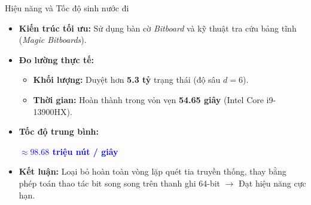 \begin{frame}{Hiệu năng và Tốc độ sinh nước đi}
    \begin{itemize}
        \item<1-> \textbf{Kiến trúc tối ưu:} Sử dụng bàn cờ \textit{Bitboard} và kỹ thuật tra cứu bảng tĩnh (\textit{Magic Bitboards}).
        \item<2-> \textbf{Đo lường thực tế:}
        \begin{itemize}
            \item \textbf{Khối lượng:} Duyệt hơn \textbf{5.3 tỷ} trạng thái (độ sâu $d=6$).
            \item \textbf{Thời gian:} Hoàn thành trong vỏn vẹn \textbf{54.65 giây} (Intel Core i9-13900HX).
        \end{itemize}
        \item<3-> \textbf{Tốc độ trung bình:}
        \begin{center}
            \Large \textbf{\textcolor{blue}{$\approx 98.68$ triệu nút / giây}}
        \end{center}
        \item<4-> \textbf{Kết luận:} Loại bỏ hoàn toàn vòng lặp quét tia truyền thống, thay bằng phép toán thao tác bit song song trên thanh ghi 64-bit $\rightarrow$ Đạt hiệu năng cực hạn.
    \end{itemize}
\end{frame}

